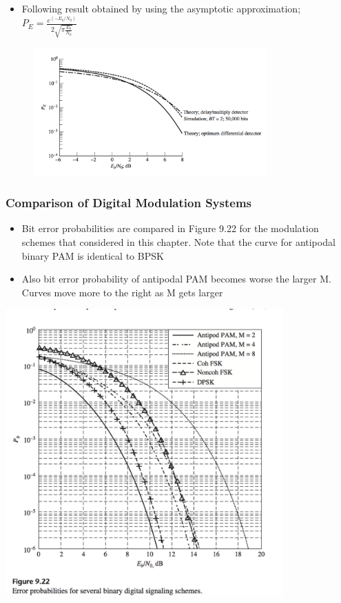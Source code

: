 \documentclass{beamer}
\begin{document}
\begin{frame}
	\begin{itemize}
	\item Following result obtained by using the asymptotic approximation;
	$P_E=\frac{e^(-E_b/N_0)}{2 \sqrt{\pi \frac {E_b}{N_0}}}$
	\end{itemize}
\begin{figure}
	\includegraphics[width=0.8\textwidth]{9_5.png}
\end{figure}
\end{frame}
\begin{frame}
	\frametitle{Comparison of Digital Modulation Systems}
	\begin{itemize}
		\item Bit error probabilities are compared in Figure 9.22 for the modulation schemes that considered in this chapter. Note that the curve for antipodal binary PAM is identical to BPSK
		\item  Also bit error probability of antipodal PAM  becomes worse the larger M. Curves move more to the right as M gets larger
	\end{itemize}
\includegraphics[width=0.8\textwidth]{9_5_1.png}
\end{frame}
\end{document}
